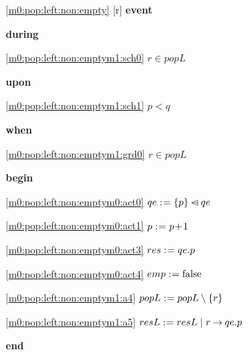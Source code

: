 \noindent \ref{m0:pop:left:non:empty} [r] \textbf{event}
\begin{block}
  \item   \textbf{during}
  \begin{block}
  \item[ \eqref{m0:pop:left:non:emptym1:sch0} ]$r \in popL $ %
  \end{block}
  \item   \textbf{upon}
  \begin{block}
  \item[ \eqref{m0:pop:left:non:emptym1:sch1} ]$p < q $ %
  \end{block}
  \item   \textbf{when}
  \begin{block}
  \item[ \eqref{m0:pop:left:non:emptym1:grd0} ]$r \in popL $ %
  \end{block}
  \item   \textbf{begin}
  \begin{block}
  \item[ \eqref{m0:pop:left:non:emptym0:act0} ]$qe \mathrel{:\mkern1mu=} \{ p \} \mathbin{\lhd\mkern-14mu-} qe $ %
  \item[ \eqref{m0:pop:left:non:emptym0:act1} ]$p \mathrel{:\mkern1mu=} p\! + \!1 $ %
  \item[ \eqref{m0:pop:left:non:emptym0:act3} ]$res \mathrel{:\mkern1mu=} qe.p $ %
  \item[ \eqref{m0:pop:left:non:emptym0:act4} ]$emp \mathrel{:\mkern1mu=} \text{false} $ %
  \item[ \eqref{m0:pop:left:non:emptym1:a4} ]$popL \mathrel{:\mkern1mu=} popL \setminus \{ r \} $ %
  \item[ \eqref{m0:pop:left:non:emptym1:a5} ]$resL \mathrel{:\mkern1mu=} resL \; | \; r \mathbin\rightarrow qe.p $ %
  \end{block}
  \item   \textbf{end} \\
\end{block}
